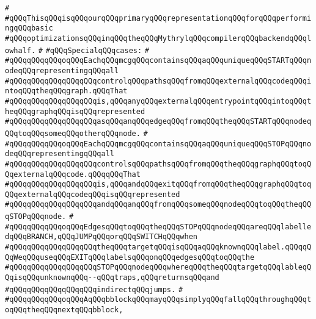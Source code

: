 \verb|#|\newline
\verb|#qQQqThisqQQqisqQQqourqQQqprimaryqQQqrepresentationqQQqforqQQqperformingqQQqbasic|\newline
\verb|#qQQqoptimizationsqQQqinqQQqtheqQQqMythrylqQQqcompilerqQQqbackendqQQqlowhalf.|\newline
\verb|#|\newline
\verb|#qQQqSpecialqQQqcases:|\newline
\verb|#|\newline
\verb|#qQQqqQQqqQQqoqQQqEachqQQqmcgqQQqcontainsqQQqaqQQquniqueqQQqSTARTqQQqnodeqQQqrepresentingqQQqall|\newline
\verb|#qQQqqQQqqQQqqQQqqQQqcontrolqQQqpathsqQQqfromqQQqexternalqQQqcodeqQQqintoqQQqtheqQQqgraph.qQQqThat|\newline
\verb|#qQQqqQQqqQQqqQQqqQQqis,qQQqanyqQQqexternalqQQqentrypointqQQqintoqQQqtheqQQqgraphqQQqisqQQqrepresented|\newline
\verb|#qQQqqQQqqQQqqQQqqQQqasqQQqanqQQqedgeqQQqfromqQQqtheqQQqSTARTqQQqnodeqQQqtoqQQqsomeqQQqotherqQQqnode.|\newline
\verb|#|\newline
\verb|#qQQqqQQqqQQqoqQQqEachqQQqmcgqQQqcontainsqQQqaqQQquniqueqQQqSTOPqQQqnodeqQQqrepresentingqQQqall|\newline
\verb|#qQQqqQQqqQQqqQQqqQQqcontrolsqQQqpathsqQQqfromqQQqtheqQQqgraphqQQqtoqQQqexternalqQQqcode.qQQqqQQqThat|\newline
\verb|#qQQqqQQqqQQqqQQqqQQqis,qQQqandqQQqexitqQQqfromqQQqtheqQQqgraphqQQqtoqQQqexternalqQQqcodeqQQqisqQQqrepresented|\newline
\verb|#qQQqqQQqqQQqqQQqqQQqandqQQqanqQQqfromqQQqsomeqQQqnodeqQQqtoqQQqtheqQQqSTOPqQQqnode.|\newline
\verb|#|\newline
\verb|#qQQqqQQqqQQqoqQQqEdgesqQQqtoqQQqtheqQQqSTOPqQQqnodeqQQqareqQQqlabelledqQQqBRANCH,qQQqJUMPqQQqorqQQqSWITCHqQQqwhen|\newline
\verb|#qQQqqQQqqQQqqQQqqQQqtheqQQqtargetqQQqisqQQqaqQQqknownqQQqlabel.qQQqqQQqWeqQQquseqQQqEXITqQQqlabelsqQQqonqQQqedgesqQQqtoqQQqthe|\newline
\verb|#qQQqqQQqqQQqqQQqqQQqSTOPqQQqnodeqQQqwhereqQQqtheqQQqtargetqQQqlableqQQqisqQQqunknownqQQq--qQQqtraps,qQQqreturnsqQQqand|\newline
\verb|#qQQqqQQqqQQqqQQqqQQqindirectqQQqjumps.|\newline
\verb|#|\newline
\verb|#qQQqqQQqqQQqoqQQqAqQQqbblockqQQqmayqQQqsimplyqQQqfallqQQqthroughqQQqtoqQQqtheqQQqnextqQQqbblock,|\newline
